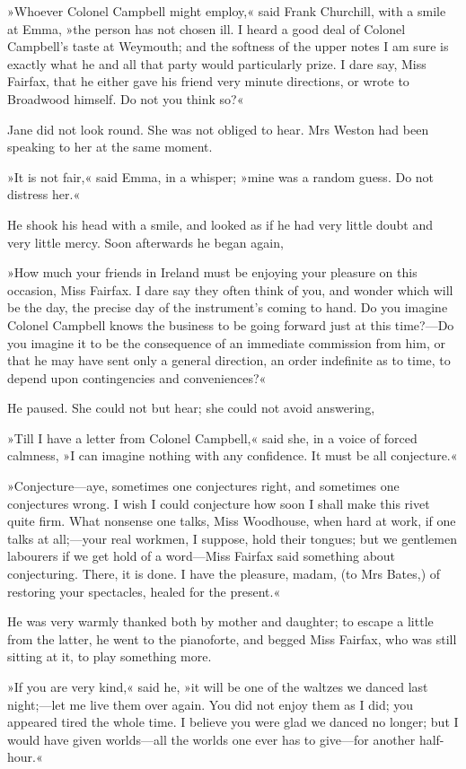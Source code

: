 »Whoever Colonel Campbell might employ,« said Frank Churchill, with a smile at Emma, »the person has not chosen ill. I heard a good deal of Colonel Campbell's taste at Weymouth; and the softness of the upper notes I am sure is exactly what he and all that party would particularly prize. I dare say, Miss Fairfax, that he either gave his friend very minute directions, or wrote to Broadwood himself. Do not you think so?«

Jane did not look round. She was not obliged to hear. Mrs Weston had been speaking to her at the same moment.

»It is not fair,« said Emma, in a whisper; »mine was a random guess. Do not distress her.«

He shook his head with a smile, and looked as if he had very little doubt and very little mercy. Soon afterwards he began again,

»How much your friends in Ireland must be enjoying your pleasure on this occasion, Miss Fairfax. I dare say they often think of you, and wonder which will be the day, the precise day of the instrument's coming to hand. Do you imagine Colonel Campbell knows the business to be going forward just at this time?—Do you imagine it to be the consequence of an immediate commission from him, or that he may have sent only a general direction, an order indefinite as to time, to depend upon contingencies and conveniences?«

He paused. She could not but hear; she could not avoid answering,

»Till I have a letter from Colonel Campbell,« said she, in a voice of forced calmness, »I can imagine nothing with any confidence. It must be all conjecture.«

»Conjecture—aye, sometimes one conjectures right, and sometimes one conjectures wrong. I wish I could conjecture how soon I shall make this rivet quite firm. What nonsense one talks, Miss Woodhouse, when hard at work, if one talks at all;—your real workmen, I suppose, hold their tongues; but we gentlemen labourers if we get hold of a word—Miss Fairfax said something about conjecturing. There, it is done. I have the pleasure, madam, (to Mrs Bates,) of restoring your spectacles, healed for the present.«

He was very warmly thanked both by mother and daughter; to escape a little from the latter, he went to the pianoforte, and begged Miss Fairfax, who was still sitting at it, to play something more.

»If you are very kind,« said he, »it will be one of the waltzes we danced last night;—let me live them over again. You did not enjoy them as I did; you appeared tired the whole time. I believe you were glad we danced no longer; but I would have given worlds—all the worlds one ever has to give—for another half-hour.«

